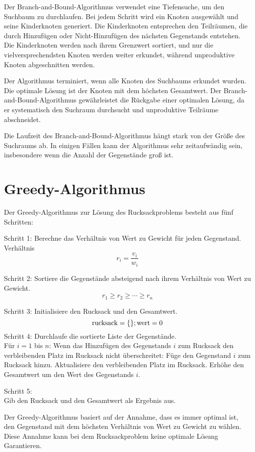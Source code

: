 Der Branch-and-Bound-Algorithmus verwendet eine Tiefensuche, 
um den Suchbaum zu durchlaufen. Bei jedem Schritt wird ein 
Knoten ausgewählt und seine Kinderknoten generiert. Die 
Kinderknoten entsprechen den Teilräumen, die durch 
Hinzufügen oder Nicht-Hinzufügen des nächsten Gegenstands 
entstehen. Die Kinderknoten werden nach ihrem Grenzwert 
sortiert, und nur die vielversprechendsten Knoten werden 
weiter erkundet, während unproduktive Knoten abgeschnitten 
werden.

Der Algorithmus terminiert, wenn alle Knoten des Suchbaums 
erkundet wurden. Die optimale Lösung ist der Knoten mit dem 
höchsten Gesamtwert. Der Branch-and-Bound-Algorithmus 
gewährleistet die Rückgabe einer optimalen Lösung, da er 
systematisch den Suchraum durchsucht und unproduktive 
Teilräume abschneidet.

Die Laufzeit des 
Branch-and-Bound-Algorithmus hängt stark von der Größe des 
Suchraums ab. In einigen Fällen kann der Algorithmus 
sehr zeitaufwändig sein, insbesondere wenn die Anzahl der 
Gegenstände groß ist.\ \cite[vgl.]{Martello1987}

\section{Greedy-Algorithmus}
Der Greedy-Algorithmus zur Lösung des Rucksackproblems besteht 
aus fünf Schritten:

Schritt 1: Berechne das Verhältnis von Wert zu Gewicht für 
jeden Gegenstand.
Verhältnis \[r_i = \frac{v_i}{w_i}\]

Schritt 2: Sortiere die Gegenstände absteigend nach ihrem 
Verhältnis von Wert zu Gewicht.
\[r_1 \geq r_2 \geq \cdots \geq r_n\]

Schritt 3: Initialisiere den Rucksack und den Gesamtwert.
\[   \text{rucksack} = \{\}; \\
    \text{wert} = 0 \]
Schritt 4: Durchlaufe die sortierte Liste der Gegenstände.\\
Für $i = 1$ bis $n$: 
Wenn das Hinzufügen des Gegenstands $i$ zum Rucksack den 
verbleibenden Platz im Rucksack nicht überschreitet:
Füge den Gegenstand $i$ zum Rucksack hinzu.
Aktualisiere den verbleibenden Platz im Rucksack.
Erhöhe den Gesamtwert um den Wert des Gegenstands $i$.

Schritt 5: \\Gib den Rucksack und den Gesamtwert als Ergebnis 
aus.

Der Greedy-Algorithmus basiert auf der Annahme, dass es 
immer optimal ist, den Gegenstand mit dem höchsten Verhältnis 
von Wert zu Gewicht zu wählen. Diese Annahme kann bei dem Rucksackproblem
keine optimale Lösung Garantieren.

